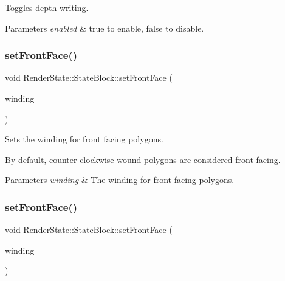 Toggles depth writing.


\begin{DoxyParams}{Parameters}
{\em enabled} & true to enable, false to disable. \\
\hline
\end{DoxyParams}
\mbox{\label{classRenderState_1_1StateBlock_aeb2cec31e5c14cfc37205b5a2d798ec8}} 
\subsubsection{\texorpdfstring{set\+Front\+Face()}{setFrontFace()}\hspace{0.1cm}{\footnotesize\ttfamily [1/2]}}
{\footnotesize\ttfamily void Render\+State\+::\+State\+Block\+::set\+Front\+Face (\begin{DoxyParamCaption}\item[{\hyperlink{classRenderState_ac748310042b020a92ea97ede898be30e}{Front\+Face}}]{winding }\end{DoxyParamCaption})}

Sets the winding for front facing polygons.

By default, counter-\/clockwise wound polygons are considered front facing.


\begin{DoxyParams}{Parameters}
{\em winding} & The winding for front facing polygons. \\
\hline
\end{DoxyParams}
\mbox{\label{classRenderState_1_1StateBlock_aeb2cec31e5c14cfc37205b5a2d798ec8}} 
\subsubsection{\texorpdfstring{set\+Front\+Face()}{setFrontFace()}\hspace{0.1cm}{\footnotesize\ttfamily [2/2]}}
{\footnotesize\ttfamily void Render\+State\+::\+State\+Block\+::set\+Front\+Face (\begin{DoxyParamCaption}\item[{\hyperlink{classRenderState_ac748310042b020a92ea97ede898be30e}{Front\+Face}}]{winding }\end{DoxyParamCaption})}

